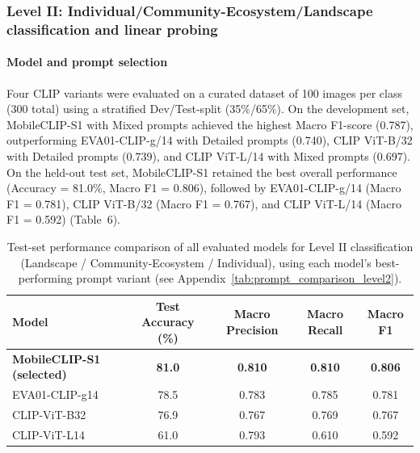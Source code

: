 \documentclass[hidelinks, 11pt]{article}
\begin{document}
\subsubsection{Level II: Individual/Community-Ecosystem/Landscape classification and linear probing}

\paragraph{Model and prompt selection}
Four CLIP variants were evaluated on a curated dataset of 100 images per class (300 total) using a stratified Dev/Test-split (35\%/65\%). On the development set, MobileCLIP-S1 with Mixed prompts achieved the highest Macro F1-score (0.787), outperforming EVA01-CLIP-g/14 with Detailed prompts (0.740), CLIP ViT-B/32 with Detailed prompts (0.739), and CLIP ViT-L/14 with Mixed prompts (0.697). On the held-out test set, MobileCLIP-S1 retained the best overall performance (Accuracy = 81.0\%, Macro F1 = 0.806), followed by EVA01-CLIP-g/14 (Macro F1 = 0.781), CLIP ViT-B/32 (Macro F1 = 0.767), and CLIP ViT-L/14 (Macro F1 = 0.592) (Table~6).

\begin{table}[htbp]
\centering
\caption{Test-set performance comparison of all evaluated models for Level II classification (Landscape / Community-Ecosystem / Individual), using each model's best-performing prompt variant (see Appendix~\ref{tab:prompt_comparison_level2}).}
\label{tab:level2_final_comparison}
\begin{tabular}{@{}lcccc@{}}
\toprule
\textbf{Model} & \textbf{Test Accuracy (\%)} & \textbf{Macro Precision} & \textbf{Macro Recall} & \textbf{Macro F1} \\
\midrule
\textbf{MobileCLIP-S1 (selected)} & \textbf{81.0} & \textbf{0.810} & \textbf{0.810} & \textbf{0.806} \\
EVA01-CLIP-g14              & 78.5 & 0.783 & 0.785 & 0.781 \\
CLIP-ViT-B32                & 76.9 & 0.767 & 0.769 & 0.767 \\
CLIP-ViT-L14                & 61.0 & 0.793 & 0.610 & 0.592 \\
\bottomrule
\end{tabular}
\end{table}
\end{document}

